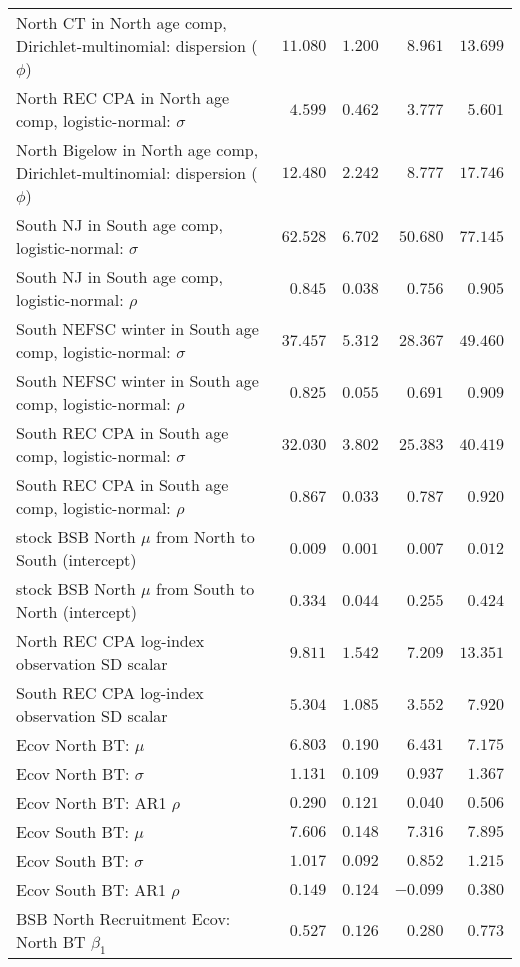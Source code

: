 \documentclass[
]{article}
\begin{document}
\begin{landscape}
\begin{longtable}[t]{lrrrr}
North CT in North age comp, Dirichlet-multinomial: dispersion ($\phi$) & $11.080$ & $1.200$ & $8.961$ & $13.699$\\
North REC CPA in North age comp, logistic-normal: $\sigma$ & $4.599$ & $0.462$ & $3.777$ & $5.601$\\
North Bigelow in North age comp, Dirichlet-multinomial: dispersion ($\phi$) & $12.480$ & $2.242$ & $8.777$ & $17.746$\\
\addlinespace
South NJ in South age comp, logistic-normal: $\sigma$ & $62.528$ & $6.702$ & $50.680$ & $77.145$\\
South NJ in South age comp, logistic-normal: $\rho$ & $0.845$ & $0.038$ & $0.756$ & $0.905$\\
South NEFSC winter in South age comp, logistic-normal: $\sigma$ & $37.457$ & $5.312$ & $28.367$ & $49.460$\\
South NEFSC winter in South age comp, logistic-normal: $\rho$ & $0.825$ & $0.055$ & $0.691$ & $0.909$\\
South REC CPA in South age comp, logistic-normal: $\sigma$ & $32.030$ & $3.802$ & $25.383$ & $40.419$\\
\addlinespace
South REC CPA in South age comp, logistic-normal: $\rho$ & $0.867$ & $0.033$ & $0.787$ & $0.920$\\
stock BSB North $\mu$ from North to South (intercept) & $0.009$ & $0.001$ & $0.007$ & $0.012$\\
stock BSB North $\mu$ from South to North (intercept) & $0.334$ & $0.044$ & $0.255$ & $0.424$\\
North REC CPA log-index observation SD scalar & $9.811$ & $1.542$ & $7.209$ & $13.351$\\
South REC CPA log-index observation SD scalar & $5.304$ & $1.085$ & $3.552$ & $7.920$\\
\addlinespace
Ecov North BT: $\mu$ & $6.803$ & $0.190$ & $6.431$ & $7.175$\\
Ecov North BT: $\sigma$ & $1.131$ & $0.109$ & $0.937$ & $1.367$\\
Ecov North BT: AR1 $\rho$ & $0.290$ & $0.121$ & $0.040$ & $0.506$\\
Ecov South BT: $\mu$ & $7.606$ & $0.148$ & $7.316$ & $7.895$\\
Ecov South BT: $\sigma$ & $1.017$ & $0.092$ & $0.852$ & $1.215$\\
\addlinespace
Ecov South BT: AR1 $\rho$ & $0.149$ & $0.124$ & $-0.099$ & $0.380$\\
BSB North Recruitment Ecov: North BT $\beta_1$ & $0.527$ & $0.126$ & $0.280$ & $0.773$\\*
\end{longtable}
\end{landscape}
\end{document}
